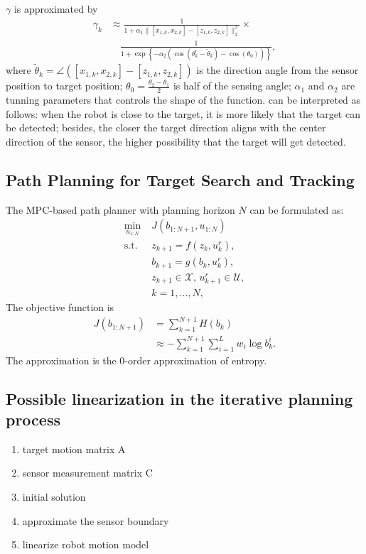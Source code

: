 \documentclass[letterpaper, 10 pt, conference]{ieeeconf}  %
\begin{document}
$\gamma$ is approximated by
\begin{equation}\label{eqn:gamma}
\begin{split}
\gamma_{k}&\approx \frac{1}{1+\alpha_1\|[x_{1,k},x_{2,k}]-[z_{1,k},z_{2,k}]\|_2^2}\times\\
&\quad\frac{1}{1+\exp{\left\lbrace-\alpha_2(\cos(\theta^r_k-\tilde{\theta}_k)-\cos(\theta_0))\right\rbrace}},
\end{split}
\end{equation}
where $\tilde{\theta}_k=\angle([x_{1,k},x_{2,k}]-[z_{1,k},z_{2,k}])$ is the direction angle from the sensor position to target position; $\theta_0=\frac{\theta_2-\theta_1}{2}$ is half of the sensing angle; $\alpha_1$ and $\alpha_2$ are tunning parameters that controls the shape of the function. 
 can be interpreted as follows:
when the robot is close to the target, it is more likely that the target can be detected; besides, the closer the target direction aligns with the center direction of the sensor, the higher possibility that the target will get detected.

\subsection{Path Planning for Target Search and Tracking}
The MPC-based path planner with planning horizon $N$ can be formulated as:
\begin{subequations}
	\begin{align}
	\min_{u_{1:N}}\; & J(b_{1:N+1},u_{1:N})\\
	\text{s.t. }\; & z_{k+1}=f(z_k,u^r_k),\\
	& b_{k+1}=g(b_k,u^r_k),\\
	& z_{k+1}\in\mathcal{X}, \, u^r_{k+1}\in\mathcal{U},\\
	& k=1,\dots,N,
	\end{align}\label{eqn:MPC}
\end{subequations}
The objective function is
\begin{align}
J(b_{1:N+1})&=\sum\limits_{k=1}^{N+1} H(b_k)\\ %
& \approx -\sum\limits_{k=1}^{N+1} \sum\limits_{i=1}^{L}w_i\log b^i_k.
\end{align}
The approximation is the $0$-order approximation of entropy.

\subsection{Possible linearization in the iterative planning process}
\begin{enumerate}
	\item target motion matrix A
	\item sensor measurement matrix C
	\item initial solution
	\item approximate the sensor boundary
	\item linearize robot motion model
\end{enumerate}
\end{document}
